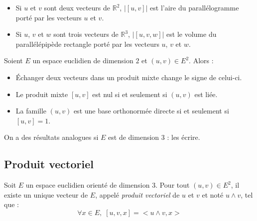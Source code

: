\documentclass[french,11pt,twoside]{VcCours}
\begin{document}
\begin{Demonstration}{}

\vspace{5cm}
\end{Demonstration}

\begin{Remarques}{}
\begin{itemize}
\item Si $u$ et $v$ sont deux vecteurs de $\mathbb{R}^2$, $\vert [u,v]\vert$ est l'aire du parallélogramme porté par les vecteurs $u$ et $v$.
\item Si $u$, $v$ et $w$ sont trois vecteurs de $\mathbb{R}^3$, $\vert [u,v,w] \vert$ est le volume du parallélépipède rectangle porté par les vecteurs $u$, $v$ et $w$.
\end{itemize}
\end{Remarques}

\begin{Proposition}{} Soient $E$ un espace euclidien de dimension $2$ et $(u,v) \in E^2$. Alors :
\begin{itemize}
\item Échanger deux vecteurs dans un produit mixte change le signe de celui-ci.
\item Le produit mixte $[u,v]$ est nul si et seulement si $(u,v)$ est liée.
\item La famille $(u,v)$ est une base orthonormée directe si et seulement si $[u,v]=1$.
\end{itemize}
\end{Proposition}

\begin{ApplicationDirecte}{} On a des résultats analogues si $E$ est de dimension $3$ : les écrire.
\end{ApplicationDirecte}

\subsection{Produit vectoriel}

\begin{TheoremeDefinition}{} Soit $E$ un espace euclidien orienté de dimension $3$. Pour tout $(u,v) \in E^2$, il existe un unique vecteur de $E$, appelé \emph{produit vectoriel} de $u$ et $v$ et noté $u \wedge v$, tel que :
$$ \forall x \in E, \; [u,v,x]=<u \wedge v, x>$$
\end{TheoremeDefinition}{}

\begin{Demonstration}{}
\vspace{5cm}
\end{Demonstration}
\end{document}
